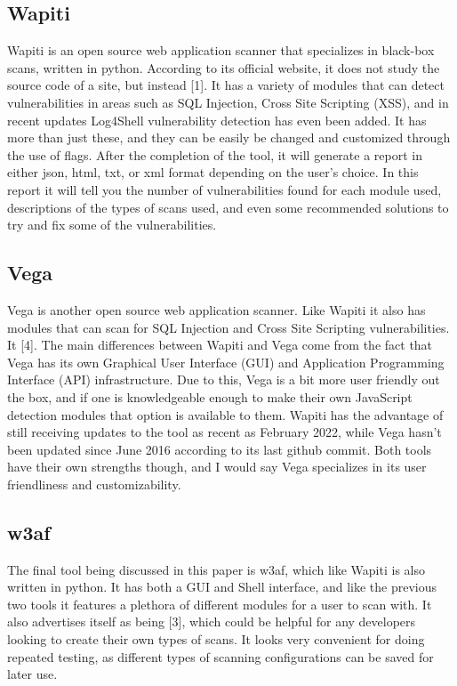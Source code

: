 \subsection{Wapiti}
\quad \quad Wapiti is an open source web application scanner that specializes in black-box scans, written in python. According 
to its official website, it does not study the source code of a site, but instead [1]. It has a variety of 
modules that can detect vulnerabilities in areas such as SQL Injection, Cross Site Scripting (XSS), and in recent updates 
Log4Shell vulnerability detection has even been added. It has more than just these, and they can be easily be changed and customized 
through the use of flags. After the completion of the tool, it will generate a report in either json, html, txt, 
or xml format depending on the user's choice. In this report it will tell you the number of vulnerabilities found for each 
module used, descriptions of the types of scans used, and even some recommended solutions to try and fix 
some of the vulnerabilities.
\subsection{Vega}
\quad \quad Vega is another open source web application scanner. Like Wapiti it also has modules that can scan for SQL Injection and 
Cross Site Scripting vulnerabilities. It [4]. The main differences between
Wapiti and Vega come from the fact that Vega has its own Graphical User Interface (GUI) and Application Programming Interface (API) infrastructure. Due to this, Vega is a bit more user
friendly out the box, and if one is knowledgeable enough to make their own JavaScript detection modules that option is 
available to them. Wapiti has the advantage of still receiving updates to the tool as recent
as February 2022, while Vega hasn't been updated since June 2016 according to its last github commit. Both tools have 
their own strengths though, and I would say Vega specializes in its user friendliness and customizability.
\subsection{w3af}
\quad \quad The final tool being discussed in this paper is w3af, which like Wapiti is also written in python. It has both
a GUI and Shell interface, and like the previous two tools it features a plethora of different modules for a user to scan 
with. It also advertises itself as being [3], which could be helpful for any developers looking to 
create their own types of scans. It looks very convenient for doing repeated testing, as different types of scanning configurations
can be saved for later use.
